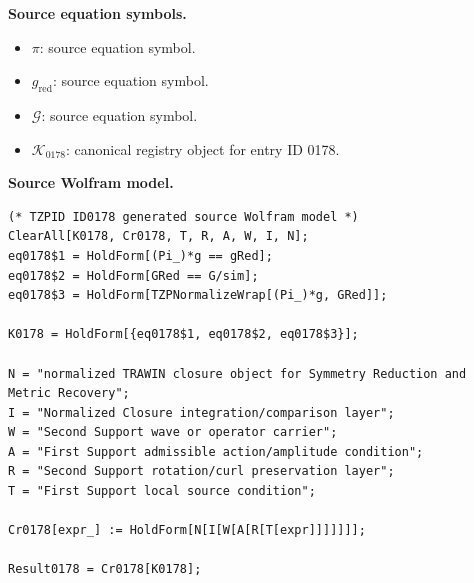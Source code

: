 \begin{minipage}[t]{0.49\linewidth}
\begingroup
\small
\raggedright
\textbf{Source equation symbols.}\par
\begin{itemize}[leftmargin=1.35em,itemsep=1pt,topsep=1pt,parsep=0pt]
    \item $\pi$: source equation symbol.
    \item $g_{\mathrm{red}}$: source equation symbol.
    \item $\mathcal{G}$: source equation symbol.
    \item $\mathcal{K}_{0178}$: canonical registry object for entry ID 0178.
\end{itemize}
\endgroup
\end{minipage}\hfill
\begin{minipage}[t]{0.47\linewidth}
\begingroup
\scriptsize
\raggedright
\textbf{Source Wolfram model.}\par
\begin{Verbatim}[fontsize=\tiny,breaklines=true,breakanywhere=true]
(* TZPID ID0178 generated source Wolfram model *)
ClearAll[K0178, Cr0178, T, R, A, W, I, N];
eq0178$1 = HoldForm[(Pi_)*g == gRed];
eq0178$2 = HoldForm[GRed == G/sim];
eq0178$3 = HoldForm[TZPNormalizeWrap[(Pi_)*g, GRed]];

K0178 = HoldForm[{eq0178$1, eq0178$2, eq0178$3}];

N = "normalized TRAWIN closure object for Symmetry Reduction and Metric Recovery";
I = "Normalized Closure integration/comparison layer";
W = "Second Support wave or operator carrier";
A = "First Support admissible action/amplitude condition";
R = "Second Support rotation/curl preservation layer";
T = "First Support local source condition";

Cr0178[expr_] := HoldForm[N[I[W[A[R[T[expr]]]]]]];

Result0178 = Cr0178[K0178];
\end{Verbatim}
\endgroup
\end{minipage}

